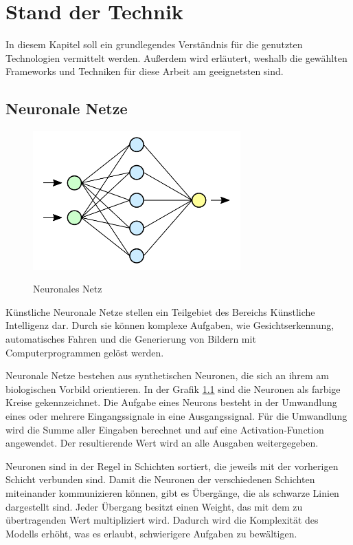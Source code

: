 
\chapter{Stand der Technik}
In diesem Kapitel soll ein grundlegendes Verständnis für die genutzten Technologien vermittelt werden.
Außerdem wird erläutert, weshalb die gewählten Frameworks und Techniken für diese Arbeit am geeignetsten sind.

\section{Neuronale Netze}
\begin{figure}[H]
	\centering
	\includegraphics[width=8cm]{kapitel/2_stand_der_technik/img/neural_networks.png}
	\label{img:neural-networks}
	\caption{Neuronales Netz \cite{img:neural-networks}}
\end{figure}

Künstliche Neuronale Netze stellen ein Teilgebiet des Bereichs Künstliche Intelligenz dar.
Durch sie können komplexe Aufgaben, wie Gesichtserkennung, automatisches Fahren und die Generierung von Bildern mit Computerprogrammen gelöst werden.
\newline

Neuronale Netze bestehen aus synthetischen Neuronen, die sich an ihrem am biologischen Vorbild orientieren.
In der Grafik \cref{img:neural-networks} sind die Neuronen als farbige Kreise gekennzeichnet.
Die Aufgabe eines Neurons besteht in der Umwandlung eines oder mehrere Eingangssignale in eine Ausgangssignal.
Für die Umwandlung wird die Summe aller Eingaben berechnet und auf eine Activation-Function angewendet.
Der resultierende Wert wird an alle Ausgaben weitergegeben.
\newline

Neuronen sind in der Regel in Schichten sortiert, die jeweils mit der vorherigen Schicht verbunden sind.
Damit die Neuronen der verschiedenen Schichten miteinander kommunizieren können, gibt es Übergänge, die als schwarze Linien dargestellt sind.
Jeder Übergang besitzt einen Weight, das mit dem zu übertragenden Wert multipliziert wird.
Dadurch wird die Komplexität des Modells erhöht, was es erlaubt, schwierigere Aufgaben zu bewältigen.
\newline

